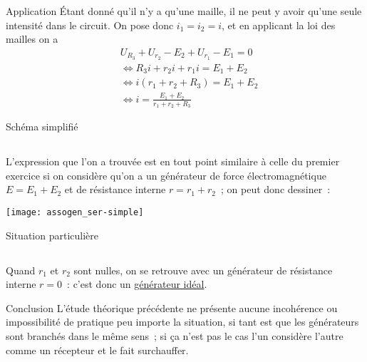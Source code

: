 \documentclass[a4paper, 12pt, final, garamond]{book}
\begin{document}
\begin{tcbraster}[raster columns=9, raster equal height=rows]
    \begin{NCexem}[raster multicolumn=4]{Application}
        Étant donné qu'il n'y a qu'une maille, il ne peut y avoir qu'une seule
        intensité dans le circuit. On pose donc $i_1 = i_2 = i$, et en applicant
        la loi des mailles on a
        \begin{align*}
            & U_{R_3} + U_{r_2} - E_2 + U_{r_1} - E_1 =
                0\\
            & \Leftrightarrow R_3i + r_2i + r_1i =
                E_1 + E_2\\
            & \Leftrightarrow i \left( r_1+r_2+R_3 \right) =
                E_1 + E_2\\
            & \Leftrightarrow \boxed{i = \frac{E_1 + E_2}{r_1+r_2+R_3}}
        \end{align*}
    \end{NCexem}    
    \begin{NCimpl}[raster multicolumn=5]{Schéma simplifié}
        \subsection{}
        L'expression que l'on a trouvée est en tout point similaire à celle du
        premier exercice si on considère qu'on a un générateur de force
        électromagnétique $E = E_1 + E_2$ et de résistance interne $r = r_1 +
        r_2$~; on peut donc dessiner~:
        \begin{center}
            \texttt{[image: assogen\_ser-simple]}
        \end{center}
    \end{NCimpl}
\end{tcbraster}
\begin{tcbraster}[raster columns=2, raster equal height=rows]
    \begin{NCcoro}{Situation particulière}
        \subsection{}
        Quand $r_1$ et $r_2$ sont nulles, on se retrouve avec un générateur de
        résistance interne $r = 0$~: c'est donc un \underline{générateur idéal}.
    \end{NCcoro}
    \begin{NCimpo}{Conclusion}
        L'étude théorique précédente ne présente aucune incohérence ou
        impossibilité de pratique peu importe la situation, si tant est que les
        générateurs sont branchés dans le même sens~; si ça n'est pas le cas
        l'un considère l'autre comme un récepteur et le fait surchauffer.
    \end{NCimpo}
\end{tcbraster}
\end{document}
